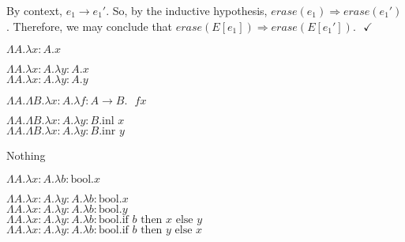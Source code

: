 \documentclass[10pt]{article}
\begin{document}
\begin{exercise}
By {\sc context}, $e_1 \rightarrow e_1'$. So, by the inductive hypothesis, $\mathit{erase}(e_1) \Rightarrow \mathit{erase}(e_1')$. Therefore, we may conclude that $\mathit{erase}(E[e_1]) \Rightarrow \mathit{erase}(E[e_1']). \texttt{ } \checkmark$ 


  

\end{exercise}

\begin{exercise}
\begin{enumerate}
\begin{minipage}{.5\textwidth}
\item  $\Lambda A. \lambda x:A. x$   \\
\item $\Lambda A. \lambda x:A. \lambda y:A. x$\\
$\Lambda A. \lambda x:A. \lambda y:A. y$
\item $\Lambda A. \Lambda B. \lambda x:A. \lambda f:A \rightarrow B. \text{ } f x$ \\
\item $\Lambda A. \Lambda B. \lambda x:A. \lambda y:B. \text{inl } x$\\
$\Lambda A. \Lambda B. \lambda x:A. \lambda y:B. \text{inr } y$
\end{minipage}\begin{minipage}{.5\textwidth}
\item Nothing\\
\item $\Lambda A. \lambda x:A. \lambda b:\text{bool}. x $\\
\item  $\Lambda A. \lambda x:A. \lambda y:A. \lambda b:\text{bool}. x $\\
$\Lambda A. \lambda x:A. \lambda y:A. \lambda b:\text{bool}. y $\\
$\Lambda A. \lambda x:A. \lambda y:A. \lambda b:\text{bool}. \text{if } b \text{ then } x \text{ else } y $\\
$\Lambda A. \lambda x:A. \lambda y:A. \lambda b:\text{bool}. \text{if } b \text{ then } y \text{ else } x$\\
\bigskip\bigskip
\end{minipage}
\end{enumerate}
\end{exercise}
\end{document}
